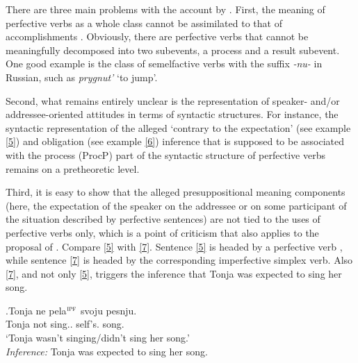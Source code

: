 There are three main problems with the account by \citet{Romanova:06}. First, the meaning of perfective verbs  as a whole class cannot be assimilated to that of accomplishments \citep[for counterarguments see][]{Filip:00, FilipRothstein:05}. Obviously, there are perfective verbs  that cannot be meaningfully decomposed into two subevents, a process and a result subevent. One good example is the class of semelfactive   verbs with the suffix \textit{-nu-}   in Russian, such as \textit{prygnut'} `to jump'. 

 Second, what remains entirely unclear is the representation of speaker- and/or addressee-oriented attitudes in terms of syntactic structures. For instance, the syntactic representation of the alleged `contrary to the expectation' (see example \ref{5}) and obligation (see example \ref{6}) inference that is supposed to be associated with the process (ProcP) part of the syntactic structure  of perfective verbs  remains on a pretheoretic level.

 Third, it is easy to show that the alleged presuppositional meaning components (here, the expectation of the speaker on the addressee or on some participant of the situation described by perfective sentences) are not tied to the uses of perfective verbs  only, which is a point of criticism that also applies to the proposal of \citet{Paducheva:96}. Compare \ref{5} with \ref{7}. Sentence \ref{5} is headed by a perfective verb , while sentence \ref{7} is headed by the corresponding imperfective simplex verb. Also \ref{7}, and not only \ref{5}, triggers the inference that Tonja was expected to sing her song.

\exg.\label{7}Tonja ne pela$^{\textsc{ipf}}$ svoju pesnju.\\
 Tonja not sing.. self's. song.\\
 \trans `Tonja wasn't singing/didn't sing her song.'\\
\textit{Inference:} Tonja was expected to sing her song.


